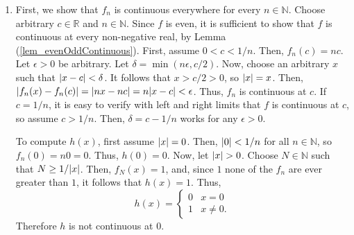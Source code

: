 \documentclass{article}
\DeclarePairedDelimiter\abs{\lvert}{\rvert}
\newcommand{\N}{\mathbb{N}}
\newcommand{\R}{\mathbb{R}}
\newcommand{\lep}[1][L]{#1et $\epsilon > 0$ be arbitrary}
\begin{document}
\begin{enumerate}
\begin{enumerate}
        \item First, we show that $f_n$ is continuous everywhere for every $n \in \N$. Choose arbitrary $c \in \R$ and $n \in \N$. Since $f$ is even, it is sufficient to show that $f$ is continuous at every non-negative real, by Lemma (\ref{lem_evenOddContinuous}). First, assume $0 < c < 1/n$. Then, $f_n(c) = n c$. \lep. Let $\delta = \min(n \epsilon, c/2)$. Now, choose an arbitrary $x$ such that $\abs{x-c} < \delta$. It follows that $x > c/2 > 0$, so $\abs{x}=x$. Then, $\abs{f_n(x)-f_n(c)} = \abs{n x-n c} = n \abs{x-c} < \epsilon$. Thus, $f_n$ is continuous at $c$. If $c = 1/n$, it is easy to verify with left and right limits that $f$ is continuous at $c$, so assume $c > 1/n$. Then, $\delta = c-1/n$ works for any $\epsilon > 0$.
        
        To compute $h(x)$, first assume $\abs{x} = 0$. Then, $\abs{0} < 1/n$ for all $n \in \N$, so $f_n(0) = n 0 = 0$. Thus, $h(0) = 0$. Now, let $\abs{x} > 0$. Choose $N \in \N$ such that $N \geq 1/\abs{x}$. Then, $f_N(x) = 1$, and, since $1$ none of the $f_n$ are ever greater than $1$, it follows that $h(x) = 1$. Thus, 
        \begin{equation*}
            h(x) = \begin{cases}
            0 & x = 0 \\ 
            1 & x \neq 0.
            \end{cases}
        \end{equation*} Therefore $h$ is not continuous at $0$.
    \end{enumerate}
\end{enumerate}
\end{document}
